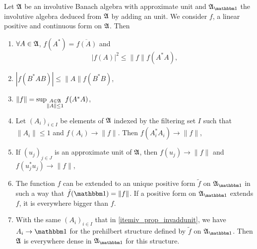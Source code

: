 \begin{proposition}
Let $\mathfrak{A}$ be an involutive Banach algebra with approximate unit and $\cA_{\cun}$ the involutive algebra deduced from $\mathfrak{A}$ by adding an unit. We consider $f$, a linear positive and continuous form on $\mathfrak{A}$. Then
\begin{enumerate}
\item \label{itemi_prop_invaddunit} $\forall A\in \mathfrak{A}$, $f(A^*)=\overline{ f(A) }$ and
\[ 
  | f(A) |^2\leq \| f \|f(A^*A),
\]
\item \label{itemii_prop_invaddunit} $| f(B^*AB) |\leq\| A \|f(B^*B)$,
\item \label{itemiii_prop_invaddunit} $\| f \|=\sup_{\substack{A\in\mathfrak{A}\\\| A \|\leq1} } f(A^*A)$,
\item \label{itemiv_prop_invaddunit} Let $(A_i)_{i\in I}$ be elements of $\mathfrak{A}$ indexed by the filtering set $I$ such that $\| A_i \|\leq 1$ and $f(A_i)\to\| f \|$. Then $f(A^*_iA_i)\to\| f \|$,
\item \label{itemv_prop_invaddunit} If $(u_j)_{j\in J}$ is an approximate unit of $\mathfrak{A}$, then $f(u_j)\to \| f \|$ and $f(u_j^*u_j)\to\| f \|$,
\item \label{itemvi_prop_invaddunit} The function $f$ can be extended to an unique positive form $\tilde f$ on $\cA_{\cun}$ in such a way that $\tilde f(\cun)=\| f \|$. If a positive form on $\cA_{\cun}$ extends $f$, it is everywhere bigger than $f$.
\item \label{itemvii_prop_invaddunit} With the same $(A_i)_{i\in I}$ that in \ref{itemiv_prop_invaddunit}, we have $A_i\to\cun$ for the prehilbert structure defined by $\tilde f$ on $\cA_{\cun}$. Then $\mathfrak{A}$ is everywhere dense in $\cA_{\cun}$ for this structure.
\end{enumerate}

\label{prop_invaddunit}
\end{proposition}

